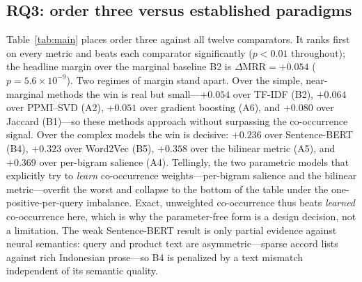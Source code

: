 \documentclass[conference]{IEEEtran}
\begin{document}
\subsection{RQ3: order three versus established paradigms}
Table~\ref{tab:main} places order three against all twelve comparators. It ranks first on
every metric and beats each comparator significantly ($p<0.01$ throughout); the headline
margin over the marginal baseline B2 is $\Delta\mathrm{MRR}=+0.054$ ($p=5.6\times10^{-9}$).
Two regimes of margin stand apart. Over the simple, near-marginal methods the win is real but
small---$+0.054$ over TF-IDF (B2), $+0.064$ over PPMI--SVD (A2), $+0.051$ over gradient
boosting (A6), and $+0.080$ over Jaccard (B1)---so these methods approach without surpassing
the co-occurrence signal. Over the complex models the win is decisive: $+0.236$ over
Sentence-BERT (B4), $+0.323$ over Word2Vec (B5), $+0.358$ over the bilinear metric (A5), and
$+0.369$ over per-bigram salience (A4). Tellingly, the two parametric models that explicitly
try to \emph{learn} co-occurrence weights---per-bigram salience and the bilinear metric---overfit
the worst and collapse to the bottom of the table under the one-positive-per-query imbalance.
Exact, unweighted co-occurrence thus beats \emph{learned} co-occurrence here, which is why the
parameter-free form is a design decision, not a limitation. The weak Sentence-BERT result is
only partial evidence against neural semantics: query and product text are asymmetric---sparse
accord lists against rich Indonesian prose---so B4 is penalized by a text mismatch independent
of its semantic quality.
\end{document}
